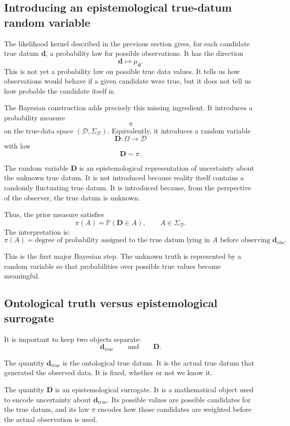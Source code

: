 \documentclass[11pt]{article}
\newcommand{\Dspace}{\mathcal D}
\newcommand{\SigmaD}{\Sigma_{\mathcal D}}
\newcommand{\prior}{\pi}
\newcommand{\Drand}{\mathbf D}
\newcommand{\dtrue}{\mathbf d_{\mathrm{true}}}
\newcommand{\dobs}{\mathbf d_{\mathrm{obs}}}
\newcommand{\Prob}{\mathbb P}
\begin{document}
\subsection{Introducing an epistemological true-datum random variable}

The likelihood kernel described in the previous section gives, for each candidate true datum \(\mathbf d\), a probability law for possible observations. It has the direction
\[
    \mathbf d
    \longmapsto
    \mu_{\mathbf d}.
\]
This is not yet a probability law on possible true data values. It tells us how observations would behave if a given candidate were true, but it does not tell us how probable the candidate itself is.

The Bayesian construction adds precisely this missing ingredient. It introduces a probability measure
\[
    \prior
\]
on the true-data space \((\Dspace,\SigmaD)\). Equivalently, it introduces a random variable
\[
    \Drand:\Omega\to\Dspace
\]
with law
\[
    \Drand\sim\prior.
\]

The random variable \(\Drand\) is an epistemological representation of uncertainty about the unknown true datum. It is not introduced because reality itself contains a randomly fluctuating true datum. It is introduced because, from the perspective of the observer, the true datum is unknown.

Thus, the prior measure satisfies
\[
    \prior(A)
    =
    \Prob(\Drand\in A),
    \qquad
    A\in\SigmaD.
\]
The interpretation is:
\[
    \prior(A)
    =
    \text{degree of probability assigned to the true datum lying in } A
    \text{ before observing } \dobs.
\]

This is the first major Bayesian step. The unknown truth is represented by a random variable so that probabilities over possible true values become meaningful.

\subsection{Ontological truth versus epistemological surrogate}

It is important to keep two objects separate:
\[
    \dtrue
    \qquad
    \text{and}
    \qquad
    \Drand.
\]

The quantity \(\dtrue\) is the ontological true datum. It is the actual true datum that generated the observed data. It is fixed, whether or not we know it.

The quantity \(\Drand\) is an epistemological surrogate. It is a mathematical object used to encode uncertainty about \(\dtrue\). Its possible values are possible candidates for the true datum, and its law \(\prior\) encodes how those candidates are weighted before the actual observation is used.
\end{document}

